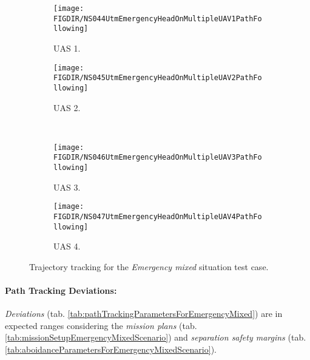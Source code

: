     
    \begin{figure}[H]
        \centering
        \begin{subfigure}{0.48\textwidth}
        	\centering
            \texttt{[image: \\FIGDIR/NS044UtmEmergencyHeadOnMultipleUAV1PathFollowing]}
            \caption{UAS 1.}
            \label{fig:emergencyMixedPathTrackingUAS1}
        \end{subfigure}
        \begin{subfigure}{0.48\textwidth}
        	\centering
            \texttt{[image: \\FIGDIR/NS045UtmEmergencyHeadOnMultipleUAV2PathFollowing]} 
            \caption{UAS 2.}
            \label{fig:emergencyMixedPathTrackingUAS2}
        \end{subfigure}
        \\
        \begin{subfigure}{0.48\textwidth}
        	\centering
            \texttt{[image: \\FIGDIR/NS046UtmEmergencyHeadOnMultipleUAV3PathFollowing]} 
            \caption{UAS 3.}
            \label{fig:emergencyMixedPathTrackingUAS4}
        \end{subfigure}
        \begin{subfigure}{0.48\textwidth}
        	\centering
            \texttt{[image: \\FIGDIR/NS047UtmEmergencyHeadOnMultipleUAV4PathFollowing]} 
            \caption{UAS 4.}
            \label{fig:emergencyMixedPathTrackingUAS3}
        \end{subfigure}
        \caption{Trajectory tracking for the \emph{Emergency mixed} situation test case.}
        \label{fig:testCaseEmergencyMixedTrajectoryTracking}
    \end{figure}
    
    \noindent\paragraph{Path Tracking Deviations:} \emph{Deviations} (tab. \ref{tab:pathTrackingParametersForEmergencyMixed}) are in expected ranges considering the \emph{mission plans} (tab. \ref{tab:missionSetupEmergencyMixedScenario}) and \emph{separation safety margins} (tab. \ref{tab:aboidanceParametersForEmergencyMixedScenario}).
    
